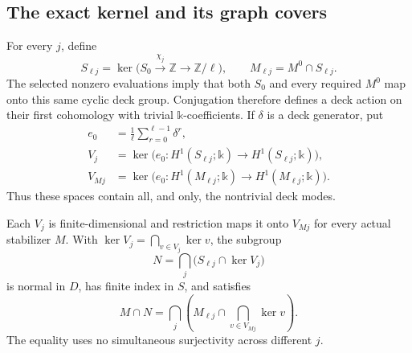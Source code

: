 \subsection{The exact kernel and its graph covers}

For every \(j\), define
\[
 S_{\ell j}=\ker\bigl(S_0\xrightarrow{\chi_j}\mathbb Z
                                \longrightarrow\mathbb Z/\ell\bigr),
 \qquad
 M_{\ell j}=M^0\cap S_{\ell j}.
\]
The selected nonzero evaluations imply that both \(S_0\) and every
required \(M^0\) map onto this same cyclic deck group.  Conjugation
therefore defines a deck action on their first cohomology with trivial
\(\mathbb k\)-coefficients.  If \(\delta\) is a deck generator, put
\[
\begin{aligned}
 e_0&=\frac1\ell\sum_{r=0}^{\ell-1}\delta^r,\\
 V_j&=\ker\bigl(e_0:H^1(S_{\ell j};\mathbb k)
                          \to H^1(S_{\ell j};\mathbb k)\bigr),\\
 V_{Mj}&=\ker\bigl(e_0:H^1(M_{\ell j};\mathbb k)
                          \to H^1(M_{\ell j};\mathbb k)\bigr).
\end{aligned}
\]
Thus these spaces contain all, and only, the nontrivial deck modes.

\begin{proposition}\label{kernel:exact-kernel}
Each \(V_j\) is finite-dimensional and restriction maps it onto
\(V_{Mj}\) for every actual stabilizer \(M\).  With
\(\ker V_j=\bigcap_{v\in V_j}\ker v\), the subgroup
\[
                     N=\bigcap_j\bigl(S_{\ell j}\cap\ker V_j\bigr)
                     \tag{K2}\label{kernel:N}
\]
is normal in \(D\), has finite index in \(S\), and satisfies
\[
 M\cap N
       =\bigcap_j\left(M_{\ell j}\cap
                         \bigcap_{v\in V_{Mj}}\ker v\right).
                     \tag{K3}\label{kernel:local-N}
\]
The equality uses no simultaneous surjectivity across different \(j\).
\end{proposition}

